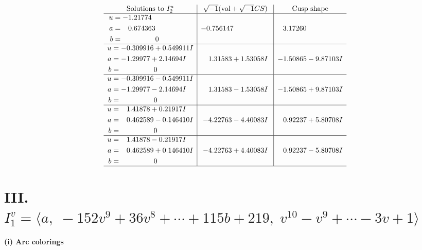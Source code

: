 \documentclass[1p]{elsarticle_modified}
\theoremstyle{definition}
\newcommand{\I}{\sqrt{-1}}
\begin{document}
$$\begin{array}{c|c|c}  
\text{Solutions to }I^u_{2}& \I (\text{vol} + \sqrt{-1}CS) & \text{Cusp shape}\\
 \hline 
\begin{aligned}
u &= -1.21774\phantom{ +0.000000I} \\
a &= \phantom{-}0.674363\phantom{ +0.000000I} \\
b &= \phantom{-0.000000 } 0\end{aligned}
 & -0.756147\phantom{ +0.000000I} & \phantom{-}3.17260\phantom{ +0.000000I} \\ \hline\begin{aligned}
u &= -0.309916 + 0.549911 I \\
a &= -1.29977 + 2.14694 I \\
b &= \phantom{-0.000000 } 0\end{aligned}
 & \phantom{-}1.31583 + 1.53058 I & -1.50865 - 9.87103 I \\ \hline\begin{aligned}
u &= -0.309916 - 0.549911 I \\
a &= -1.29977 - 2.14694 I \\
b &= \phantom{-0.000000 } 0\end{aligned}
 & \phantom{-}1.31583 - 1.53058 I & -1.50865 + 9.87103 I \\ \hline\begin{aligned}
u &= \phantom{-}1.41878 + 0.21917 I \\
a &= \phantom{-}0.462589 - 0.146410 I \\
b &= \phantom{-0.000000 } 0\end{aligned}
 & -4.22763 - 4.40083 I & \phantom{-}0.92237 + 5.80708 I \\ \hline\begin{aligned}
u &= \phantom{-}1.41878 - 0.21917 I \\
a &= \phantom{-}0.462589 + 0.146410 I \\
b &= \phantom{-0.000000 } 0\end{aligned}
 & -4.22763 + 4.40083 I & \phantom{-}0.92237 - 5.80708 I\\
 \hline 
 \end{array}$$\newpage\newpage\renewcommand{\arraystretch}{1}
\centering \section*{III. $I^v_{1}= \langle a,\;-152 v^9+36 v^8+\cdots+115 b+219,\;v^{10}- v^9+\cdots-3 v+1 \rangle$}
\flushleft \textbf{(i) Arc colorings}\\
\end{document}
